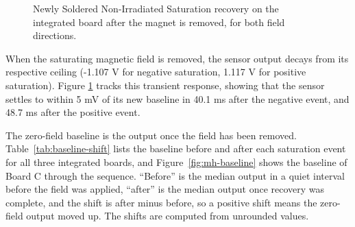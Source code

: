 \documentclass[12pt,a4paper]{article}
\begin{document}
\begin{figure}[H]
\centering
{}
\caption{Newly Soldered Non-Irradiated Saturation recovery on the integrated board after the magnet is removed, for both field directions. }
\label{fig:mh-recovery}
\end{figure}


 When the saturating magnetic field is removed, the sensor output decays from its respective ceiling (-1.107 V for negative saturation, 1.117 V for positive saturation). Figure \ref{fig:mh-recovery} tracks this transient response, showing that the sensor settles to within 5 mV of its new baseline in 40.1 ms after the negative event, and 48.7 ms after the positive event.

The zero-field baseline is the output once the field has been removed. Table~\ref{tab:baseline-shift} lists the baseline before and after each saturation event for all three integrated boards, and Figure~\ref{fig:mh-baseline} shows the baseline of Board C through the sequence. ``Before'' is the median output in a quiet interval before the field was applied, ``after'' is the median output once recovery was complete, and the shift is after minus before, so a positive shift means the zero-field output moved up. The shifts are computed from unrounded values.
\end{document}
